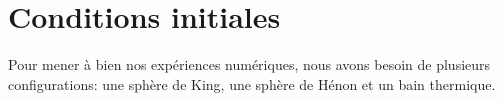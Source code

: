 





	\section{Conditions initiales}


		Pour mener à bien nos expériences numériques, nous avons besoin de plusieurs configurations: une sphère de King,
		une sphère de Hénon et un bain thermique.

